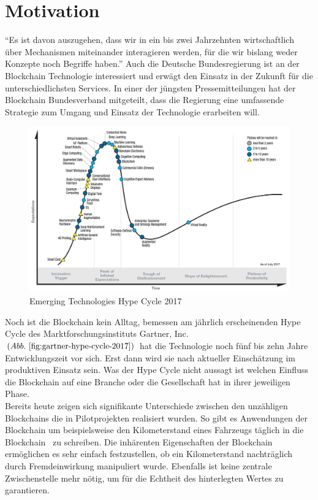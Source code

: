 \section{Motivation}

“Es ist davon auszugehen, dass wir in ein bis zwei Jahrzehnten wirtschaftlich über Mechanismen miteinander interagieren werden, für die wir bislang weder Konzepte noch Begriffe haben.” \cite[S.~92]{Platzer2014} Auch die Deutsche Bundesregierung ist an der Blockchain Technologie interessiert und erwägt den Einsatz in der Zukunft für die unterschiedlichsten Services. In einer der jüngsten Pressemitteilungen hat der Blockchain Bundesverband mitgeteilt, dass die Regierung eine umfassende Strategie zum Umgang und Einsatz der Technologie erarbeiten will. \cite{BCBundesverband2018}

\begin{figure}[h!]
	\centering
	\includegraphics[width=0.65\linewidth]{pictures/Gartner-Hype-Cycle-2017}
	\caption[Gartner Hype Cycle 2017]{Emerging Technologies Hype Cycle 2017\cite{Gartner2017}}
	\label{fig:gartner-hype-cycle-2017}
\end{figure}

Noch ist die Blockchain kein Alltag, bemessen am jährlich erscheinenden Hype Cycle des Marktforschungsinstituts Gartner, Inc. $( Abb.~ \ref{fig:gartner-hype-cycle-2017} )$ hat die Technologie noch fünf bis zehn Jahre Entwicklungszeit vor sich. Erst dann wird sie nach aktueller Einschätzung im produktiven Einsatz sein. Was der Hype Cycle nicht aussagt ist welchen Einfluss die Blockchain auf eine Branche oder die Gesellschaft hat in ihrer jeweiligen Phase.\\

Bereits heute zeigen sich signifikante Unterschiede zwischen den unzähligen Blockchains die in Pilotprojekten realisiert wurden. So gibt es Anwendungen der Blockchain um beispielsweise den Kilometerstand eines Fahrzeugs täglich \glqq in die Blockchain\grqq~ zu schreiben. Die inhärenten Eigenschaften der Blockchain ermöglichen es sehr einfach festzustellen, ob ein Kilometerstand nachträglich durch Fremdeinwirkung manipuliert wurde. Ebenfalls ist keine zentrale Zwischenstelle mehr nötig, um für die Echtheit des hinterlegten Wertes zu garantieren. \cite{carVertical}\\

